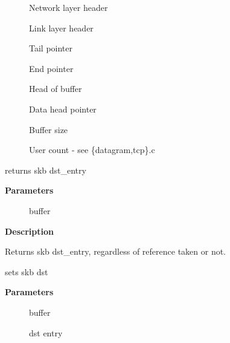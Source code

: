 \documentclass[a4paper,8pt,english]{sphinxmanual}
\begin{document}
\begin{description}
\item[{}] \leavevmode
Network layer header

\item[{}] \leavevmode
Link layer header

\item[{}] \leavevmode
Tail pointer

\item[{}] \leavevmode
End pointer

\item[{}] \leavevmode
Head of buffer

\item[{}] \leavevmode
Data head pointer

\item[{}] \leavevmode
Buffer size

\item[{}] \leavevmode
User count - see \{datagram,tcp\}.c

\end{description}

\begin{fulllineitems}
\label{networking/kapi:c.skb_dst}
returns skb dst\_entry

\end{fulllineitems}


\textbf{Parameters}
\begin{description}
\item[{}] \leavevmode
buffer

\end{description}

\textbf{Description}

Returns skb dst\_entry, regardless of reference taken or not.

\begin{fulllineitems}
\label{networking/kapi:c.skb_dst_set}
sets skb dst

\end{fulllineitems}


\textbf{Parameters}
\begin{description}
\item[{}] \leavevmode
buffer

\item[{}] \leavevmode
dst entry

\end{description}
\end{document}
